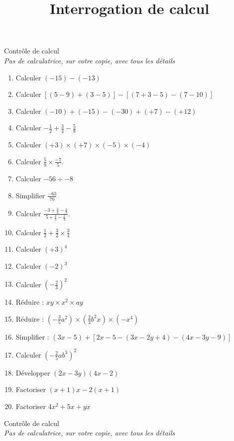 \documentclass[12 pt]{extarticle}
\title{Interrogation de calcul}
\date{}
\theoremstyle{plain}
\begin{document}
\begin{center}{\Large Contrôle de calcul}\\
\emph{Pas de calculatrice, sur votre copie, avec tous les détails}
 \end{center} 
 
 
 \begin{enumerate}
 \item Calculer $(-15)-(-13)$
 \item Calculer $[(5-9)+(3-5)]-[(7+3-5)-(7-10)]$
 \item Calculer $(-10)+(-15)-(-30)+(+7)-(+12)$
 \item Calculer $-\frac12+\frac34-\frac58$
 \item Calculer $(+3)\times (+7)\times (- 5)\times (-4)$
 \item Calculer $\displaystyle\frac59\times \frac{-7}5$.
 \item Calculer $-56 \div -8$
 \item Simplifier $\displaystyle\frac{-63}{70}$
 \item Calculer $\displaystyle\frac{-3+\frac34-\frac13}{5+\frac25-\frac23}$.
 \item Calculer $\frac12+\frac32\times \frac34$
 \item Calculer $(+3)^4$
 \item Calculer $(-2)^3$
 \item Calculer $\displaystyle\left(-\frac23\right)^2$
 \item Réduire : $xy \times x^2 \times ay$
 \item Réduire : $\displaystyle\left(-\frac35a^2\right)\times \left(\frac23b^2x\right)\times (-x^4)$
 \item Simplifier : $(3x-5) + [2x-5-(3x-2y+4)-(4x-3y-9)]$
 \item Calculer $\left(-\frac25ab^3\right)^2$
 \item Développer $(2x-3y)(4x-2)$
 \item Factoriser $(x+1)x - 2(x+1)$
 \item Factoriser $4x^2 + 5x + yx$
 
 \end{enumerate}
 
 
 \newpage 
 
\begin{center}{\Large Contrôle de calcul}\\
\emph{Pas de calculatrice, sur votre copie, avec tous les détails}
 \end{center} 
 
\end{document}
